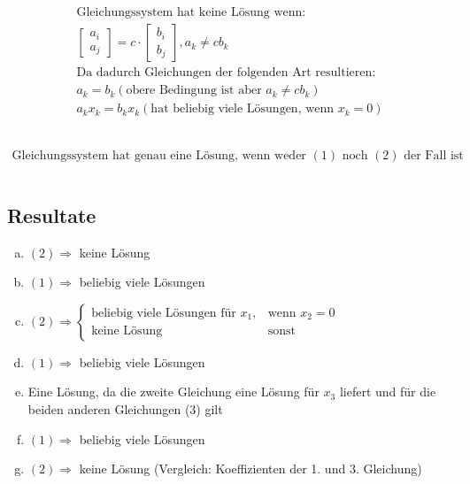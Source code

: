 \documentclass{article}
\begin{document}
    \begin{equation}
        \begin{gathered}
            \\
            \text{Gleichungssystem hat keine Lösung wenn: } \\
            \begin{bmatrix} a_i \\ a_j \end{bmatrix}
            = c \cdot \begin{bmatrix} b_i \\ b_j \end{bmatrix}, 
            a_k \neq cb_k \\
            \text{Da dadurch Gleichungen der folgenden Art resultieren: } \\
            a_k = b_k (\text{obere Bedingung ist aber }  a_k \neq cb_k) \\
            a_k x_k = b_k x_k (\text{hat beliebig viele Lösungen, wenn } x_k=0)\\
            \\
        \end{gathered}
    \end{equation}

    \begin{equation}
        \begin{gathered}
            \\
            \text{Gleichungssystem hat genau eine Lösung, wenn weder } (1) \text{ noch } (2) \text{ der Fall ist}
            \\ \\
        \end{gathered}
    \end{equation}

    \newpage

    \subsection{Resultate}

    \begin{enumerate}[(a)]
    \item $(2) \Rightarrow $ keine Lösung
    \item $(1) \Rightarrow $ beliebig viele Lösungen
    \item $(2) \Rightarrow \begin{cases} \text{beliebig viele Lösungen für }x_1,& \text{wenn } x_2=0 \\ \text{keine Lösung }& \text{sonst} \end{cases}$ 
    \item $(1) \Rightarrow $ beliebig viele Lösungen
    \item Eine Lösung, da die zweite Gleichung eine Lösung für $x_3$ liefert und für die beiden anderen Gleichungen (3) gilt
    \item $(1) \Rightarrow $ beliebig viele Lösungen
    \item $(2) \Rightarrow $ keine Lösung (Vergleich: Koeffizienten der 1. und 3. Gleichung)
    \end{enumerate}
\end{document}
